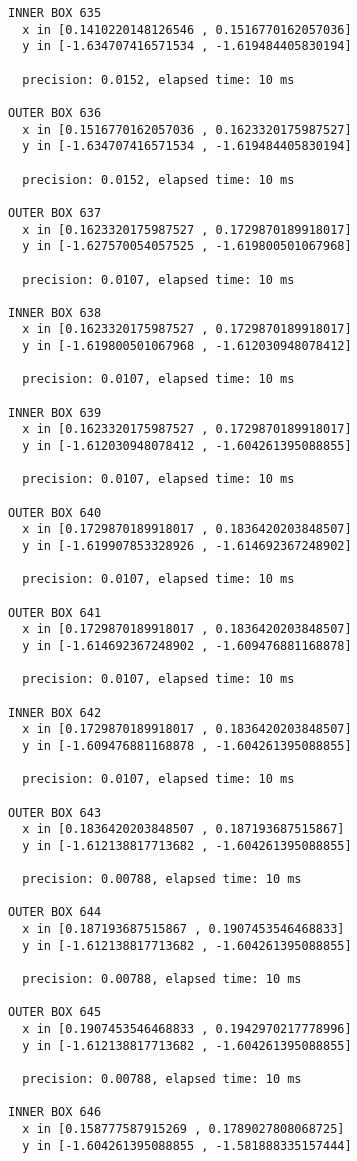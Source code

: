 \begin{verbatim}
INNER BOX 635
  x in [0.1410220148126546 , 0.1516770162057036]
  y in [-1.634707416571534 , -1.619484405830194]

  precision: 0.0152, elapsed time: 10 ms

OUTER BOX 636
  x in [0.1516770162057036 , 0.1623320175987527]
  y in [-1.634707416571534 , -1.619484405830194]

  precision: 0.0152, elapsed time: 10 ms

OUTER BOX 637
  x in [0.1623320175987527 , 0.1729870189918017]
  y in [-1.627570054057525 , -1.619800501067968]

  precision: 0.0107, elapsed time: 10 ms

INNER BOX 638
  x in [0.1623320175987527 , 0.1729870189918017]
  y in [-1.619800501067968 , -1.612030948078412]

  precision: 0.0107, elapsed time: 10 ms

INNER BOX 639
  x in [0.1623320175987527 , 0.1729870189918017]
  y in [-1.612030948078412 , -1.604261395088855]

  precision: 0.0107, elapsed time: 10 ms

OUTER BOX 640
  x in [0.1729870189918017 , 0.1836420203848507]
  y in [-1.619907853328926 , -1.614692367248902]

  precision: 0.0107, elapsed time: 10 ms

OUTER BOX 641
  x in [0.1729870189918017 , 0.1836420203848507]
  y in [-1.614692367248902 , -1.609476881168878]

  precision: 0.0107, elapsed time: 10 ms

INNER BOX 642
  x in [0.1729870189918017 , 0.1836420203848507]
  y in [-1.609476881168878 , -1.604261395088855]

  precision: 0.0107, elapsed time: 10 ms

OUTER BOX 643
  x in [0.1836420203848507 , 0.187193687515867]
  y in [-1.612138817713682 , -1.604261395088855]

  precision: 0.00788, elapsed time: 10 ms

OUTER BOX 644
  x in [0.187193687515867 , 0.1907453546468833]
  y in [-1.612138817713682 , -1.604261395088855]

  precision: 0.00788, elapsed time: 10 ms

OUTER BOX 645
  x in [0.1907453546468833 , 0.1942970217778996]
  y in [-1.612138817713682 , -1.604261395088855]

  precision: 0.00788, elapsed time: 10 ms

INNER BOX 646
  x in [0.158777587915269 , 0.1789027808068725]
  y in [-1.604261395088855 , -1.581888335157444]


\end{verbatim}
